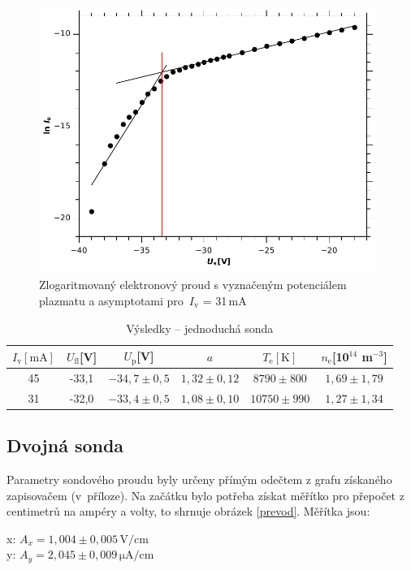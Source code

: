 \documentclass[12pt]{article}
\begin{document}
\begin{figure}[htbp]
\begin{center}
\includegraphics[width=11cm]{ln31.pdf}
\caption{Zlogaritmovaný elektronový proud s vyznačeným potenciálem plazmatu a asymptotami pro~$I_\mathrm{v}$ = 31\,mA}
\label{ln31}
\end{center}
\end{figure}

\begin{table}[htbp]
\begin{center}
\begin{tabular}{|c|c|c|c|c|c|}
\hline
$I_\mathrm{v}[\mathrm{mA}]$ & $U_\mathrm{fl}$[V] & $U_\mathrm{p}$[V] & $a$ & \boldmath$T_\mathrm{e} \mathrm{[K]}$ & $n_\mathrm{e}$[10${^{14}}$ m$^{-3}$] \\ \hline
45 & -33,1 & $-34,7\pm0,5$ & $1,32\pm0,12$ & \boldmath$8790\pm800$ & $1,69\pm1,79$ \\ \hline
31 & -32,0 & $-33,4\pm0,5$ & $1,08\pm0,10$ & \boldmath$10750\pm990$ & $1,27\pm1,34$ \\ \hline
\end{tabular}
\end{center}
\caption{Výsledky -- jednoduchá sonda}
\label{vysledkyjednoducha}
\end{table}

\subsection{Dvojná sonda}
Parametry sondového proudu byly určeny přímým odečtem z grafu získaného zapisovačem (v~pří\-lo\-ze). Na začátku bylo potřeba získat měřítko pro přepočet z centimetrů na ampéry a volty, to shrnuje obrázek \ref{prevod}. Měřítka jsou:
\begin{center}
x: $A_x = 1,004 \pm 0,005 \, \mathrm{V/cm}$\\
y: $A_y = 2,045 \pm 0,009 \, \mathrm{\mu A/cm}$
\end{center}
\end{document}
